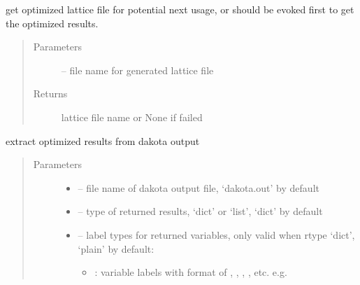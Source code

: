 \documentclass[letterpaper,10pt,english]{sphinxmanual}
\begin{document}
\begin{fulllineitems}
\begin{fulllineitems}
\end{fulllineitems}


\begin{fulllineitems}
\label{\detokenize{src/apidocs/dakopt:genopt.dakopt.DakotaOC.get_opt_latfile}}
get optimized lattice file for potential next usage,
 or  should be evoked first to get the 
optimized results.
\begin{quote}\begin{description}
\item[{Parameters}] \leavevmode
{} -- file name for generated lattice file

\item[{Returns}] \leavevmode
lattice file name or None if failed

\end{description}\end{quote}

\end{fulllineitems}


\begin{fulllineitems}
\label{\detokenize{src/apidocs/dakopt:genopt.dakopt.DakotaOC.get_opt_results}}
extract optimized results from dakota output
\begin{quote}\begin{description}
\item[{Parameters}] \leavevmode\begin{itemize}
\item {} 
 -- file name of dakota output file, 
`dakota.out' by default

\item {} 
 -- type of returned results, `dict' or `list', 
`dict' by default

\item {} 
 -- 
label types for returned variables, only valid when rtype `dict', 
`plain' by default:
\begin{itemize}
\item {} 
: variable labels with format of , , , , etc.
e.g. 


\end{itemize}
\end{itemize}
\end{description}
\end{quote}
\end{fulllineitems}
\end{fulllineitems}
\end{document}
